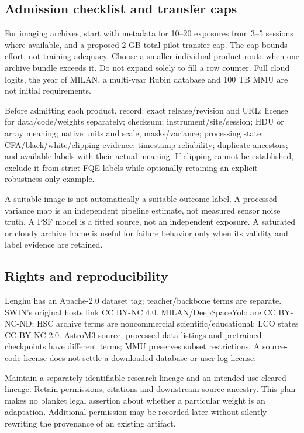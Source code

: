 \documentclass[11pt,a4paper]{article}
\begin{document}
\subsection{Admission checklist and transfer caps}
For imaging archives, start with metadata for 10--20 exposures from 3--5
sessions where available, and a proposed 2 GB total pilot transfer cap. The cap
bounds effort, not training adequacy. Choose a smaller individual-product
route when one archive bundle exceeds it. Do not expand solely to fill a row
counter. Full cloud logits, the year of MILAN, a multi-year Rubin database and
100 TB MMU are not initial requirements.

Before admitting each product, record: exact release/revision and URL;
license for data/code/weights separately; checksum; instrument/site/session;
HDU or array meaning; native units and scale; masks/variance; processing state;
CFA/black/white/clipping evidence; timestamp reliability; duplicate ancestors;
and available labels with their actual meaning. If clipping cannot be
established, exclude it from strict FQE labels while optionally retaining an
explicit robustness-only example.

A suitable image is not automatically a suitable outcome label. A processed
variance map is an independent pipeline estimate, not measured sensor noise
truth. A PSF model is a fitted source, not an independent exposure. A saturated
or cloudy archive frame is useful for failure behavior only when its validity
and label evidence are retained.

\subsection{Rights and reproducibility}
Lenghu has an Apache-2.0 dataset tag; teacher/backbone terms are separate.
SWIN's original hosts link CC BY-NC 4.0. MILAN/DeepSpaceYolo are CC BY-NC-ND;
HSC archive terms are noncommercial scientific/educational; LCO states CC BY-NC
2.0. AstroM3 source, processed-data listings and pretrained checkpoints have
different terms; MMU preserves subset restrictions. A source-code license does
not settle a downloaded database or user-log license.

Maintain a separately identifiable research lineage and an intended-use-cleared
lineage. Retain permissions, citations and downstream source ancestry. This
plan makes no blanket legal assertion about whether a particular weight is an
adaptation. Additional permission may be recorded later without silently
rewriting the provenance of an existing artifact.
\end{document}
